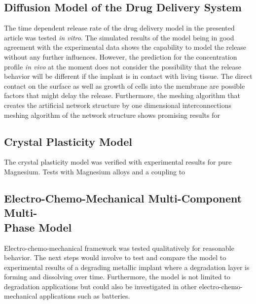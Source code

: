 \subsection{Diffusion Model of the Drug Delivery System}
The time dependent release rate of the drug delivery model in the presented article was tested \textit{in vitro}. The simulated results of the model being in good agreement with the experimental data shows the capability to model the release without any further influences. However, the prediction for the concentration profile \textit{in vivo} at the moment does not consider the possibility that the release behavior will be different if the implant is in contact with living tissue. The direct contact on the surface as well as growth of cells into the membrane are possible factors that might delay the release. Furthermore, the meshing algorithm that creates the artificial network structure by one dimensional interconnections meshing algorithm of the network structure shows promising results for 

\subsection{Crystal Plasticity Model}
The crystal plasticity model was verified with experimental results for pure Magnesium. Tests with Magnesium alloys and a coupling to 

\subsection{Electro-Chemo-Mechanical Multi-Component Multi-\\Phase Model}
Electro-chemo-mechanical framework was tested qualitatively for reasonable behavior. The next steps would involve to test and compare the model to experimental results of a degrading metallic implant where a degradation layer is forming and dissolving over time. Furthermore, the model is not limited to degradation applications but could also be investigated in other electro-chemo-mechanical applications such as batteries. 